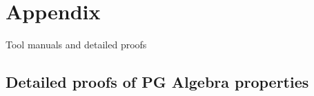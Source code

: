 









\chapter*{Appendix}

Tool manuals and detailed proofs



\section{Detailed proofs of PG Algebra properties}

